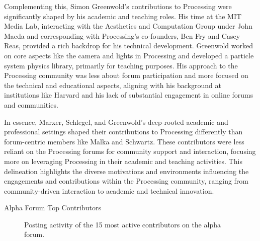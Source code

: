 Complementing this, Simon Greenwold's contributions to Processing were significantly shaped by his academic and teaching roles. His time at the MIT Media Lab, interacting with the Aesthetics and Computation Group under John Maeda and corresponding with Processing's co-founders, Ben Fry and Casey Reas, provided a rich backdrop for his technical development. Greenwold worked on core aspects like the camera and lights in Processing and developed a particle system physics library, primarily for teaching purposes. His approach to the Processing community was less about forum participation and more focused on the technical and educational aspects, aligning with his background at institutions like Harvard and his lack of substantial engagement in online forums and communities​​​​.

In essence, Marxer, Schlegel, and Greenwold's deep-rooted academic and professional settings shaped their contributions to Processing differently than forum-centric members like Malka and Schwartz. These contributors were less reliant on the Processing forums for community support and interaction, focusing more on leveraging Processing in their academic and teaching activities. This delineation highlights the diverse motivations and environments influencing the engagements and contributions within the Processing community, ranging from community-driven interaction to academic and technical innovation.

\changepapersize{305.3mm:210mm}

{
	\LARGE
	\noindent Alpha Forum Top Contributors\par
	\vspace{0.2cm} 
}
\vfill

\begin{figure}[h!]
	\centering
	\caption{Posting activity of the 15 most active contributors on the alpha forum.}
	\label{fig:processing-alpha-dot}
\end{figure}

